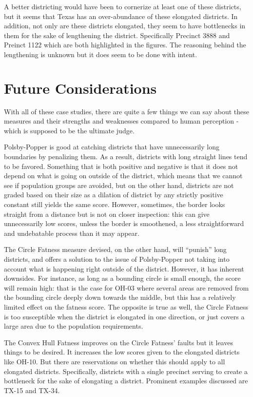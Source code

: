 \documentclass[letterpaper]{article}
\begin{document}
A better districting would have been to cornerize at least one of these districts, but it seems that Texas has an over-abundance of these elongated districts. In addition, not only are these districts elongated, they seem to have bottlenecks in them for the sake of lengthening the district. Specifically Precinct 3888 and Preinct 1122 which are both highlighted in the figures. The reasoning behind the lengthening is unknown but it does seem to be done with intent.

\section{Future Considerations}
With all of these case studies, there are quite a few things we can say about these measures and their strengths and weaknesses compared to human perception - which is supposed to be the ultimate judge.

Polsby-Popper is good at catching districts that have unnecessarily long boundaries by penalizing them. As a result, districts with long straight lines tend to be favored. Something that is both positive and negative is that it does not depend on what is going on outside of the district, which means that we cannot see if population groups are avoided, but on the other hand, districts are not graded based on their size as a dilation of district by any strictly positive constant still yields the same score. However, sometimes, the border looks straight from a distance but is not on closer inspection: this can give unnecessarily low scores, unless the border is smoothened, a less straightforward and undebatable process than it may appear.

The Circle Fatness measure devised, on the other hand, will “punish” long districts, and offers a solution to the issue of Polsby-Popper not taking into account what is happening right outside of the district. However, it has inherent downsides. For instance, as long as a bounding circle is small enough, the score will remain high: that is the case for OH-03 where several areas are removed from the bounding circle deeply down towards the middle, but this has a relatively limited effect on the fatness score. The opposite is true as well, the Circle Fatness is too susceptible when the district is elongated in one direction, or just covers a large area due to the population requirements.

The Convex Hull Fatness improves on the Circle Fatness' faults but it leaves things to be desired. It increases the low scores given to the elongated districts like OH-10. But there are reservations on whether this should apply to all elongated districts. Specifically, districts with a single precinct serving to create a bottleneck for the sake of elongating a district. Prominent examples discussed are TX-15 and TX-34.
\end{document}
